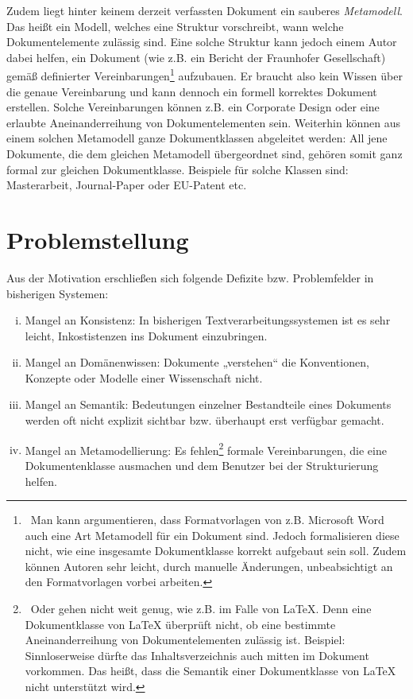  
Zudem liegt hinter keinem derzeit verfassten Dokument ein sauberes \emph{Metamodell}. Das heißt ein Modell, welches eine Struktur vorschreibt, wann welche Dokumentelemente zulässig sind. Eine solche Struktur kann jedoch einem Autor dabei helfen, ein Dokument (wie z.B. ein Bericht der Fraunhofer Gesellschaft) gemäß definierter Vereinbarungen\footnote{~Man kann argumentieren, dass Formatvorlagen von z.B. Microsoft Word auch eine Art Metamodell für ein Dokument sind. Jedoch formalisieren diese nicht, wie eine insgesamte Dokumentklasse korrekt aufgebaut sein soll. Zudem können Autoren sehr leicht, durch manuelle Änderungen, unbeabsichtigt an den Formatvorlagen vorbei arbeiten.} aufzubauen. Er braucht also kein Wissen über die genaue Vereinbarung und kann dennoch ein formell korrektes Dokument erstellen. Solche Vereinbarungen können z.B. ein Corporate Design oder eine erlaubte Aneinanderreihung von Dokumentelementen sein. Weiterhin können aus einem solchen Metamodell ganze Dokumentklassen abgeleitet werden: All jene Dokumente, die dem gleichen Metamodell übergeordnet sind, gehören somit ganz formal zur gleichen Dokumentklasse. Beispiele für solche Klassen sind: Masterarbeit, Journal-Paper oder EU-Patent etc.

 
\section{Problemstellung}\label{problemstellung}
 
Aus der Motivation erschließen sich folgende Defizite bzw. Problemfelder in bisherigen Systemen:

 
\begin{enumerate}[(i)]

\item
Mangel an Konsistenz: In bisherigen Textverarbeitungssystemen ist es sehr leicht, Inkostistenzen ins Dokument einzubringen.


\item
Mangel an Domänenwissen: Dokumente „verstehen“ die Konventionen, Konzepte oder Modelle einer Wissenschaft nicht.


\item
Mangel an Semantik: Bedeutungen einzelner Bestandteile eines Dokuments werden oft nicht explizit sichtbar bzw. überhaupt erst verfügbar gemacht.


\item
Mangel an Metamodellierung: Es fehlen\footnote{~Oder gehen nicht weit genug, wie z.B. im Falle von LaTeX. Denn eine Dokumentklasse von LaTeX überprüft nicht, ob eine bestimmte Aneinanderreihung von Dokumentelementen zulässig ist. Beispiel: Sinnloserweise dürfte das Inhaltsverzeichnis auch mitten im Dokument vorkommen. Das heißt, dass die Semantik einer Dokumentklasse von LaTeX nicht unterstützt wird.} formale Vereinbarungen, die eine Dokumentenklasse ausmachen und dem Benutzer bei der Strukturierung helfen.


\end{enumerate}
 
